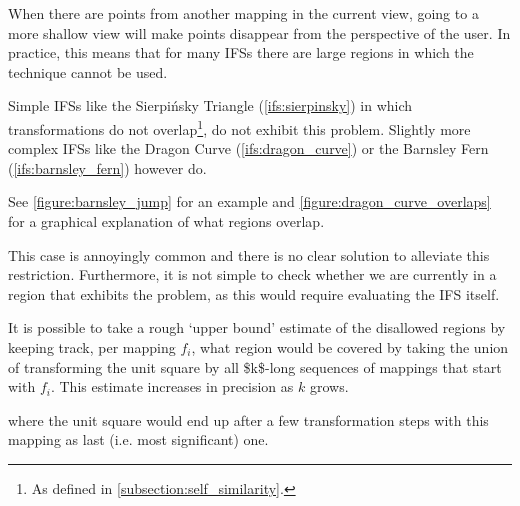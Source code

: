 \documentclass[11pt]{article}
\begin{document}
\begin{enumerate}

When there are points from another mapping in the current view, 
going to a more shallow view will make points disappear from the perspective of the user.
In practice, this means that for many IFSs there are large regions in which the technique cannot be used.

Simple IFSs like the Sierpińsky Triangle (\autoref{ifs:sierpinsky}) in which transformations
do not overlap\footnote{As defined in \autoref{subsection:self_similarity}.}, do not exhibit this problem. 
Slightly more complex IFSs like the Dragon Curve (\autoref{ifs:dragon_curve}) or the Barnsley Fern (\autoref{ifs:barnsley_fern}) however do.

See \autoref{figure:barnsley_jump} for an example 
and \autoref{figure:dragon_curve_overlaps} for a graphical explanation of what regions overlap.


This case is annoyingly common and there is no clear solution to alleviate this restriction.
Furthermore, it is not simple to check whether we are currently in a region that exhibits the problem,
as this would require evaluating the IFS itself.

It is possible to take a rough `upper bound' estimate of the disallowed regions by keeping track, 
per mapping \(f_i\), what region would be covered by 
taking the union of transforming the unit square by all \$k\$-long sequences of mappings that start with \(f_i\).
This estimate increases in precision as \(k\) grows.

where the unit square would end up after a few transformation steps with this mapping as last (i.e. most significant) one.



\end{enumerate}
\end{document}
